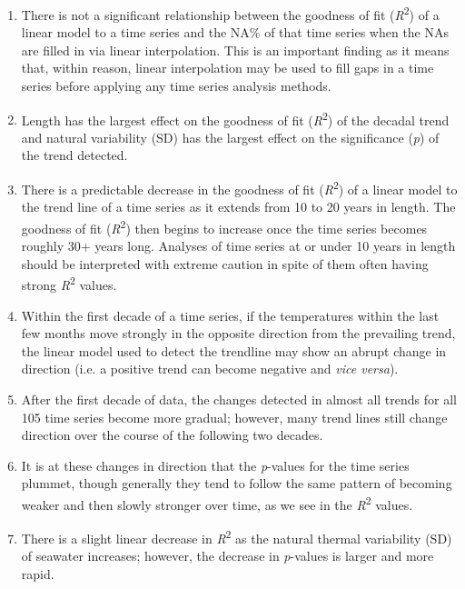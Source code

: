 \documentclass{ametsoc}
\begin{document}
\begin{enumerate}
\item There is not a significant relationship between the goodness of fit (\emph{R}\textsuperscript{2}) of a linear model to a time series and the NA\% of that time series when the NAs are filled in via linear interpolation. This is an important finding as it means that, within reason, linear interpolation may be used to fill gaps in a time series before applying any time series analysis methods.

\item Length has the largest effect on the goodness of fit (\emph{R}\textsuperscript{2}) of the decadal trend and natural variability (SD) has the largest effect on the significance (\emph{p}) of the trend detected.

\item There is a predictable decrease in the goodness of fit (\emph{R}\textsuperscript{2}) of a linear model to the trend line of a time series as it extends from 10 to 20 years in length. The goodness of fit (\emph{R}\textsuperscript{2}) then begins to increase once the time series becomes roughly 30+ years long. Analyses of time series at or under 10 years in length should be interpreted with extreme caution in spite of them often having strong \emph{R}\textsuperscript{2} values.

\item Within the first decade of a time series, if the temperatures within the last few months move strongly in the opposite direction from the prevailing trend, the linear model used to detect the trendline may show an abrupt change in direction (i.e. a positive trend can become negative and \emph{vice versa}).

\item After the first decade of data, the changes detected in almost all trends for all 105 time series become more gradual; however, many trend lines still change direction over the course of the following two decades.

\item It is at these changes in direction that the \emph{p}-values for the time series plummet, though generally they tend to follow the same pattern of becoming weaker and then slowly stronger over time, as we see in the \emph{R}\textsuperscript{2} values.

\item There is a slight linear decrease in \emph{R}\textsuperscript{2} as the natural thermal variability (SD) of seawater increases; however, the decrease in \emph{p}-values is larger and more rapid.


\end{enumerate}
\end{document}
